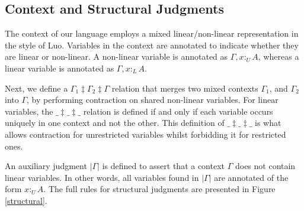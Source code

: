 \documentclass[sigplan,screen]{acmart}
\theoremstyle{definition}
\newcommand{\pure}[1]{|#1|}
\newcommand{\utype}{:_{\scriptscriptstyle U}}
\newcommand{\ltype}{:_{\scriptscriptstyle L}}
\newcommand{\mrg}[3]{#1\ddagger#2\ddagger#3}
\begin{document}
  \subsection{Context and Structural Judgments}
  The context of our language employs a mixed linear/non-linear representation in the style of Luo\cite{luo}. Variables in the context are annotated to indicate whether they are linear or non-linear. A non-linear variable is annotated as $\Gamma, x \utype A$, whereas a linear variable is annotated as $\Gamma, x \ltype A$. 
  
  Next, we define a $\mrg{\Gamma_1}{\Gamma_2}{\Gamma}$ relation that merges two mixed contexts $\Gamma_1$, and $\Gamma_2$ into $\Gamma$, by performing contraction on shared non-linear variables. For linear variables, the $\mrg{\_}{\_}{\_}$ relation is defined if and only if each variable occurs uniquely in one context and not the other. This definition of $\mrg{\_}{\_}{\_}$ is what allows contraction for unrestricted variables whilst forbidding it for restricted ones.

  An auxiliary judgment $\pure{\Gamma}$ is defined to assert that a context $\Gamma$ does not contain linear variables. In other words, all variables found in $\pure{\Gamma}$ are annotated of the form $x \utype A$. The full rules for structural judgments are presented in Figure \ref{structural}.
  
\end{document}
